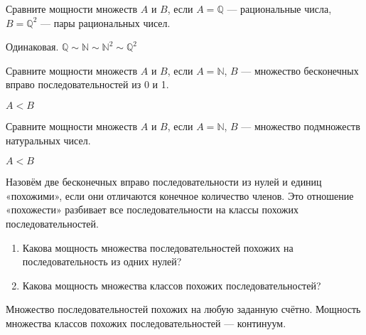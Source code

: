\begin{problem}
Сравните мощности множеств $ A $ и $ B $, если $ A=\mathbb{Q} $ --- рациональные числа, $ B=\mathbb{Q}^{2} $ --- пары рациональных чисел.
\end{problem} 
\begin{solution} 
Одинаковая. $ \mathbb{Q}\sim \mathbb{N}\sim \mathbb{N}^{2}\sim \mathbb{Q}^{2} $
\end{solution}

\begin{problem}
Сравните мощности множеств $A$ и $B$, если $A=\mathbb{N}$, $B$ --- множество бесконечных вправо последовательностей из 0 и 1.
\end{problem} 
\begin{solution} 
$A<B$
\end{solution}

\begin{problem}
Сравните мощности множеств $A$ и $B$, если $A=\mathbb{N}$, $B$ --- множество подмножеств натуральных чисел.
\end{problem} 
\begin{solution} 
$A<B$
\end{solution}

\begin{problem}
Назовём две бесконечных вправо последовательности из нулей и единиц «похожими», если они отличаются конечное количество членов. Это отношение «похожести» разбивает все последовательности на классы похожих последовательностей.

\begin{enumerate}
\item Какова мощность множества последовательностей похожих на последовательность из одних нулей?
\item Какова мощность множества классов похожих последовательностей?
\end{enumerate} 
\end{problem}
\begin{solution}
Множество последовательностей похожих на любую заданную счётно. Мощность множества классов похожих последовательностей --- континуум.
\end{solution}

